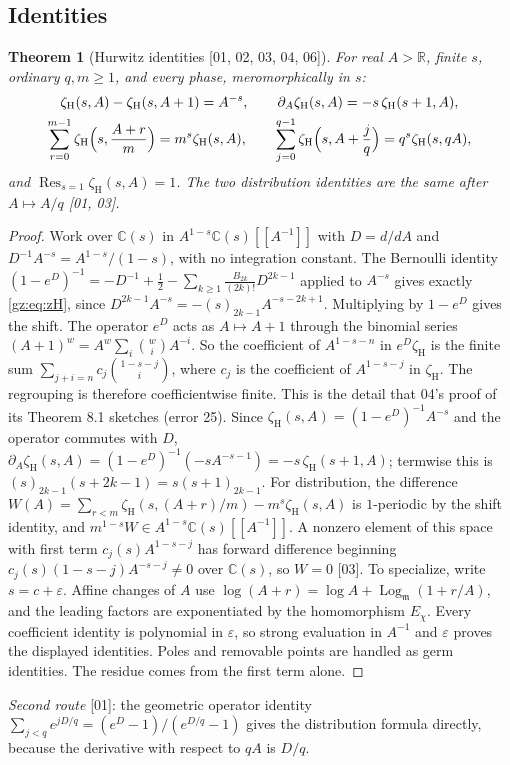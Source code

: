 \documentclass[11pt,a4paper]{article}
\numberwithin{equation}{section}
\newtheorem{theorem}{Theorem}[section]
\theoremstyle{definition}
\theoremstyle{remark}
\newcommand{\R}{\mathbb R}
\newcommand{\C}{\mathbb C}
\newcommand{\mm}{\mathfrak m}
\newcommand{\eps}{\varepsilon}
\newcommand{\Res}{\operatorname{Res}}
\newcommand{\Lgm}{\operatorname{Log}_{\mm}}
\newcommand{\zH}{\zeta_{\mathrm H}}
\newcommand{\src}[1]{\textup{[#1]}}
\begin{document}
\subsection{Identities}
\begin{theorem}[Hurwitz identities \src{01, 02, 03, 04, 06}]\label{gz:thm:hurwitz-identities}
For real $A>\R$, finite $s$, ordinary $q,m\ge1$, and every phase,
meromorphically in $s$:
\begin{gather*}
\zH(s,A)-\zH(s,A+1)=A^{-s},\qquad\partial_A\zH(s,A)=-s\,\zH(s+1,A),\\
\sum_{r=0}^{m-1}\zH\Bigl(s,\frac{A+r}m\Bigr)=m^s\zH(s,A),\qquad
\sum_{j=0}^{q-1}\zH\Bigl(s,A+\frac jq\Bigr)=q^s\zH(s,qA),
\end{gather*}
and $\Res_{s=1}\zH(s,A)=1$. The two distribution identities are the same
after $A\mapsto A/q$ \src{01, 03}.
\end{theorem}
\begin{proof}
Work over $\C(s)$ in $A^{1-s}\C(s)[[A^{-1}]]$ with $D=d/dA$ and
$D^{-1}A^{-s}=A^{1-s}/(1-s)$, with no integration constant. The Bernoulli
identity $(1-e^D)^{-1}=-D^{-1}+\tfrac12-\sum_{k\ge1}\frac{B_{2k}}{(2k)!}D^{2k-1}$
applied to $A^{-s}$ gives exactly \eqref{gz:eq:zH}, since
$D^{2k-1}A^{-s}=-(s)_{2k-1}A^{-s-2k+1}$. Multiplying by $1-e^D$ gives the
shift. The operator $e^D$ acts as $A\mapsto A+1$ through the binomial series
$(A+1)^w=A^w\sum_i\binom wiA^{-i}$. So the coefficient of $A^{1-s-n}$ in
$e^D\zH$ is the finite sum $\sum_{j+i=n}c_j\binom{1-s-j}i$, where $c_j$ is
the coefficient of $A^{1-s-j}$ in $\zH$. The regrouping is therefore
coefficientwise finite. This is the detail that 04's proof of its Theorem
8.1 sketches (error 25). Since $\zH(s,A)=(1-e^D)^{-1}A^{-s}$ and the operator
commutes with $D$, $\partial_A\zH(s,A)=(1-e^D)^{-1}(-sA^{-s-1})=-s\,\zH(s+1,A)$;
termwise this is $(s)_{2k-1}(s+2k-1)=s(s+1)_{2k-1}$. For distribution, the
difference
$W(A)=\sum_{r<m}\zH(s,(A+r)/m)-m^s\zH(s,A)$ is $1$-periodic by the shift
identity, and $m^{1-s}W\in A^{1-s}\C(s)[[A^{-1}]]$. A nonzero element of
this space with first term $c_j(s)A^{1-s-j}$ has forward difference
beginning $c_j(s)(1-s-j)A^{-s-j}\ne0$ over $\C(s)$, so $W=0$ \src{03}. To
specialize, write $s=c+\eps$. Affine changes of $A$ use
$\log(A+r)=\log A+\Lgm(1+r/A)$, and the leading factors are exponentiated by
the homomorphism $E_\chi$. Every coefficient identity is polynomial in
$\eps$, so strong evaluation in $A^{-1}$ and $\eps$ proves the displayed
identities. Poles and removable points are handled as germ identities. The
residue comes from the first term alone.
\end{proof}
\emph{Second route} \src{01}: the geometric operator identity
$\sum_{j<q}e^{jD/q}=(e^D-1)/(e^{D/q}-1)$ gives the distribution formula
directly, because the derivative with respect to $qA$ is $D/q$.
\end{document}
